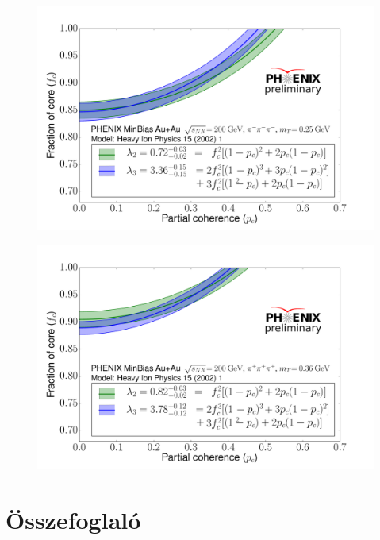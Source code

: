 \documentclass[11pt,a4paper]{article}
\numberwithin{equation}{subsection}
\numberwithin{figure}{section}
\begin{document}
\begin{figure}[H]
\centering
\includegraphics[scale=0.5]{pic/res/fcpc1.pdf}
\end{figure}
\begin{figure}[H]
\centering
\includegraphics[scale=0.5]{pic/res/fcpc2.pdf}
\end{figure}

\section{Összefoglaló}





\end{document}
